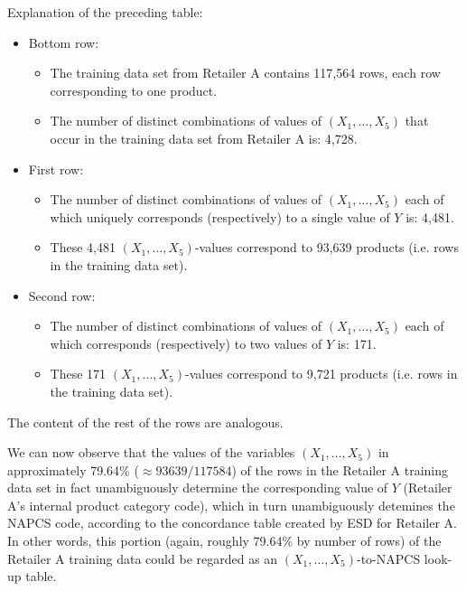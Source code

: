 \vskip 0.5cm
\noindent
Explanation of the preceding table:
\begin{itemize}
\item
	Bottom row:
	\begin{itemize}
	\item
		The training data set from Retailer A contains 117,564 rows,
		each row corresponding to one product.
	\item
		The number of distinct combinations of values of $(X_{1}, \ldots ,X_{5})$
		that occur in the training data set from Retailer A is: 4,728.
	\end{itemize}
\item
	First row:
	\begin{itemize}
	\item
		The number of distinct combinations of values of $(X_{1}, \ldots ,X_{5})$
		each of which uniquely corresponds (respectively) to a single value of $Y$
		is: 4,481.
	\item
		These 4,481 $(X_{1}, \ldots ,X_{5})$-values correspond to 93,639 products
		(i.e. rows in the training data set).
	\end{itemize}
\item
	Second row:
	\begin{itemize}
	\item
		The number of distinct combinations of values of $(X_{1}, \ldots ,X_{5})$
		each of which corresponds (respectively) to two values of $Y$ is: 171.
	\item
		These 171 $(X_{1}, \ldots ,X_{5})$-values correspond to 9,721 products
		(i.e. rows in the training data set).
	\end{itemize}
\end{itemize}
The content of the rest of the rows are analogous.

\vskip 0.5cm
\noindent
We can now observe that the values of the variables $(X_{1}, \ldots ,X_{5})$
in approximately 79.64\% ($\approx 93639 /117584$) of the rows in
the Retailer A training data set in fact unambiguously determine
the corresponding value of $Y$ (Retailer A's internal product category code),
which in turn unambiguously detemines the NAPCS code, according to the
concordance table created by ESD for Retailer A.
In other words, this portion (again, roughly 79.64\% by number of rows) of the
Retailer A training data could be regarded as an
$(X_{1}, \ldots ,X_{5})$-to-NAPCS look-up table.

